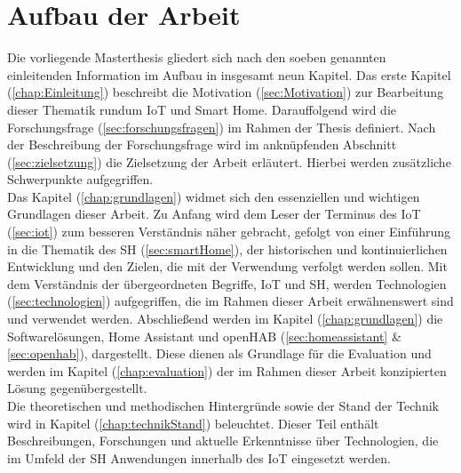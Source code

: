 \section{Aufbau der Arbeit}
\label{sec:aufbau}
    Die vorliegende Masterthesis gliedert sich nach den soeben genannten einleitenden Information im Aufbau in insgesamt 
    neun Kapitel. Das erste Kapitel (\ref{chap:Einleitung}) beschreibt die Motivation (\ref{sec:Motivation}) zur Bearbeitung 
    dieser Thematik rundum \acs{IoT} und Smart Home. Darauffolgend wird die 
    Forschungsfrage (\ref{sec:forschungsfragen}) im Rahmen der Thesis definiert. Nach der 
    Beschreibung der Forschungsfrage wird im anknüpfenden Abschnitt (\ref{sec:zielsetzung}) die Zielsetzung der 
    Arbeit erläutert. Hierbei werden zusätzliche Schwerpunkte aufgegriffen. 
    \\
    \linebreak
    Das Kapitel (\ref{chap:grundlagen}) widmet sich den essenziellen und wichtigen Grundlagen dieser Arbeit. Zu Anfang wird dem 
    Leser der Terminus des \acl{IoT} (\ref{sec:iot}) zum besseren Verständnis näher gebracht, 
    gefolgt von einer Einführung in die Thematik des \acl{SH} (\ref{sec:smartHome}), der 
    historischen und kontinuierlichen Entwicklung und den Zielen, die mit der Verwendung verfolgt 
    werden sollen. Mit dem Verständnis der übergeordneten Begriffe, \acs{IoT} und \acl{SH}, werden Technologien 
    (\ref{sec:technologien}) aufgegriffen, die im Rahmen dieser Arbeit erwähnenswert sind und verwendet werden. %
    Abschließend werden im Kapitel (\ref{chap:grundlagen}) die Softwarelösungen, Home Assistant 
    und openHAB (\ref{sec:homeassistant} \& \ref{sec:openhab}), dargestellt. Diese dienen als Grundlage für die Evaluation und werden im Kapitel 
    (\ref{chap:evaluation}) der im Rahmen dieser Arbeit konzipierten Lösung gegenübergestellt. 
    \\
    \linebreak
    Die theoretischen und methodischen Hintergründe sowie der Stand der Technik wird in Kapitel (\ref{chap:technikStand})
    beleuchtet. Dieser Teil enthält Beschreibungen, Forschungen und aktuelle Erkenntnisse über Technologien, die im Umfeld der 
    \acl{SH} Anwendungen innerhalb des \acs{IoT} eingesetzt werden. 
    \\
    \linebreak

